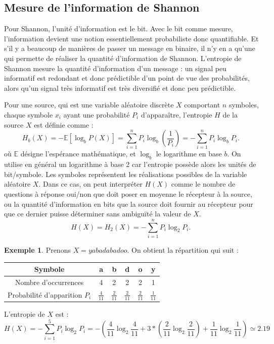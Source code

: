 \documentclass[10pt,a4paper]{article}
\theoremstyle{definition}
\newtheorem{example}{Exemple}
\numberwithin{lemma}{subsection}
\numberwithin{theorem}{subsection}
\numberwithin{definition}{subsection}
\numberwithin{proposition}{subsection}
\numberwithin{corollary}{subsection}
\numberwithin{property}{subsection}
\numberwithin{example}{subsection}
\numberwithin{heuristique}{subsection}
\numberwithin{scenario}{subsection}
\begin{document}
	\subsection{Mesure de l'information de Shannon}

Pour Shannon, l'unité d'information est le bit. Avec le bit comme mesure, l’information devient une notion essentiellement probabiliste donc quantifiable. Et s’il y a beaucoup de manières de passer un message en binaire, il n’y en a qu’une qui permette de réaliser la quantité d’information de Shannon. L’entropie de Shannon mesure la quantité d’information d’un message : un signal peu informatif est redondant et donc prédictible d’un point de vue des probabilités, alors qu’un signal très informatif est très diversifié et donc peu prédictible.
\par Pour une source, qui est une variable aléatoire discrète $X$ comportant $n$ symboles, chaque symbole $x_i$ ayant une probabilité $P_i$ d'apparaître, l'entropie $H$ de la source $X$ est définie comme :
$$H_b(X)= -\mathbb E [\log_b {P(X)}] = \sum_{i=1}^nP_i\log_b \left(\frac{1}{P_i}\right)=-\sum_{i=1}^nP_i\log_b P_i.\,\!$$
où $\mathbb  E$ désigne l'espérance mathématique, et $\log _{b}$ le logarithme en base $b$. On utilise en général un logarithme à base 2 car l'entropie possède alors les unités de bit/symbole. Les symboles représentent les réalisations possibles de la variable aléatoire $X$. Dans ce cas, on peut interpréter $H(X)$ comme le nombre de questions à réponse oui/non que doit poser en moyenne le récepteur à la source, ou la quantité d'information en bits que la source doit fournir au récepteur pour que ce dernier puisse déterminer sans ambiguïté la valeur de $X$.
$$H(X)=H_2(X)= -\sum_{i=1}^nP_i\log_2 P_i.\,\!$$

\begin{example}\label{ex:entropie_shannon}
Prenons $X = yabadabadoo$. On obtient la répartition qui suit :
\par\begin{tabular}{|c|c|c|c|c|c|}
\hline
Symbole & a & b & d & o & y \\
\hline
Nombre d'occurrences & 4 & 2 & 2 & 2 & 1 \\
\hline
Probabilité d'apparition $P_i$ & $\frac{4}{11}$ & $\frac{2}{11}$ & $\frac{2}{11}$ & $\frac{2}{11}$ & $\frac{1}{11}$ \\
\hline
\end{tabular}
\par L'entropie de $X$ est :
$$H(X) = -\sum_{i=1}^5P_i\log_2 P_i = -(\frac{4}{11}\log_2\frac{4}{11}+3*
(\frac{2}{11}\log_2\frac{2}{11})+
\frac{1}{11}\log_2\frac{1}{11}) \simeq 2.19$$
\end{example}
\end{document}
